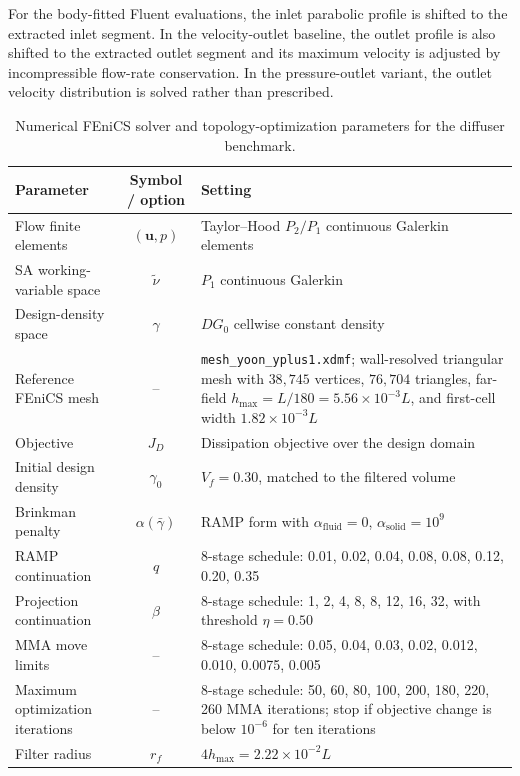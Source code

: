 For the body-fitted Fluent evaluations, the inlet parabolic profile is shifted to the extracted inlet segment. In the velocity-outlet baseline, the outlet profile is also shifted to the extracted outlet segment and its maximum velocity is adjusted by incompressible flow-rate conservation. In the pressure-outlet variant, the outlet velocity distribution is solved rather than prescribed.

\begin{table}[htbp]
	\centering
	\footnotesize
	\caption{Numerical FEniCS solver and topology-optimization parameters for the diffuser benchmark.}
	\label{tab:app_B_yoon_diffuser_numerical}
	\renewcommand{\arraystretch}{1.2}
	\begin{tabularx}{\textwidth}{l c X}
		\hline
		\textbf{Parameter} & \textbf{Symbol / option} & \textbf{Setting} \\
		\hline
		Flow finite elements & $(\mathbf{u},p)$ & Taylor--Hood $P_2/P_1$ continuous Galerkin elements \\
		SA working-variable space & $\tilde{\nu}$ & $P_1$ continuous Galerkin \\
		Design-density space & $\gamma$ & $DG_0$ cellwise constant density \\
		Reference FEniCS mesh & -- & \texttt{mesh\_yoon\_yplus1.xdmf}; wall-resolved triangular mesh with $38{,}745$ vertices, $76{,}704$ triangles, far-field $h_{\max}=L/180=5.56\times10^{-3}L$, and first-cell width $1.82\times10^{-3}L$ \\
		Objective & $J_D$ & Dissipation objective over the design domain \\
		Initial design density & $\gamma_0$ & $V_f=0.30$, matched to the filtered volume \\
		Brinkman penalty & $\alpha(\bar{\gamma})$ & RAMP form with $\alpha_{\mathrm{fluid}}=0$, $\alpha_{\mathrm{solid}}=10^9$ \\
			RAMP continuation & $q$ & 8-stage schedule: 0.01, 0.02, 0.04, 0.08, 0.08, 0.12, 0.20, 0.35 \\
			Projection continuation & $\beta$ & 8-stage schedule: 1, 2, 4, 8, 8, 12, 16, 32, with threshold $\eta=0.50$ \\
			MMA move limits & -- & 8-stage schedule: 0.05, 0.04, 0.03, 0.02, 0.012, 0.010, 0.0075, 0.005 \\
			Maximum optimization iterations & -- & 8-stage schedule: 50, 60, 80, 100, 200, 180, 220, 260 MMA iterations; stop if objective change is below $10^{-6}$ for ten iterations \\
		Filter radius & $r_f$ & $4h_{\max}=2.22\times10^{-2}L$ \\

\end{tabularx}
\end{table}
